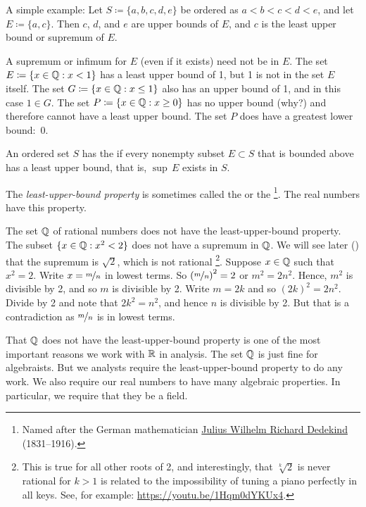 A simple example:
Let $S \coloneqq \{ a, b, c, d, e \}$ be ordered as $a < b < c < d < e$, and
let $E \coloneqq \{ a, c \}$.  Then $c$, $d$, and $e$ are upper bounds of $E$, and
$c$ is the least upper bound or supremum of $E$.

A supremum or infimum for $E$ (even if it exists) need not be
in $E$.  The set $E \coloneqq \{ x \in {\mathbb{Q}} : x < 1 \}$ has a least upper
bound of 1, but 1 is not in the set $E$ itself.
The set
$G \coloneqq \{ x \in {\mathbb{Q}} : x \leq 1 \}$ also has an upper bound of 1,
and in this case $1 \in G$.
The set $P \coloneqq \{ x \in {\mathbb{Q}} : x \geq 0 \}$ has no upper bound (why?) and therefore
cannot have a least upper bound.  The set $P$ does have a greatest lower
bound:~0.

\begin{defn} \label{defn:lub}
An ordered set $S$ has the \emph{} if
every nonempty
subset $E \subset S$ that is bounded above has a least upper bound,
that is, $\sup\, E$ exists in $S$.
\end{defn}

The \emph{least-upper-bound property}
is sometimes called the \emph{} or the
\emph{}%
\footnote{%
Named after the German mathematician
\href{https://en.wikipedia.org/wiki/Richard_Dedekind}{Julius Wilhelm Richard Dedekind}
(1831--1916).}.
The real numbers have this property.

\begin{example}
The set ${\mathbb{Q}}$ of rational numbers does not have the least-upper-bound property.  The subset
$\{ x \in {\mathbb{Q}} : x^2 < 2 \}$ does not have a supremum in ${\mathbb{Q}}$.  We will
see later () that the supremum is
$\sqrt{2}$, which is not rational%
\footnote{This is true for all other roots of 2, and interestingly,
that $\sqrt[k]{2}$ is never rational for $k > 1$ is related to
the impossibility of tuning a piano
perfectly in all keys.  See, for example:
\url{https://youtu.be/1Hqm0dYKUx4}.}.
Suppose $x \in {\mathbb{Q}}$ such that $x^2 = 2$.
Write $x=\nicefrac{m}{n}$ in lowest terms.  So ${(\nicefrac{m}{n})}^2 = 2$
or
$m^2 = 2n^2$.  Hence, $m^2$ is divisible by 2, and so $m$ is divisible by
2.  Write $m = 2k$ and so ${(2k)}^2 = 2n^2$.  Divide by 2
and note that $2k^2 = n^2$, and hence $n$ is divisible by 2.  But that is a
contradiction as $\nicefrac{m}{n}$ is in lowest terms.
\end{example}

That ${\mathbb{Q}}$ does not have the least-upper-bound property is one of the most
important reasons we work with ${\mathbb{R}}$ in analysis.  The set ${\mathbb{Q}}$
is just fine for algebraists.  But we analysts require the least-upper-bound
property to do any work.
We also require our real numbers to have many algebraic properties.
In particular, we require that they be a field.


